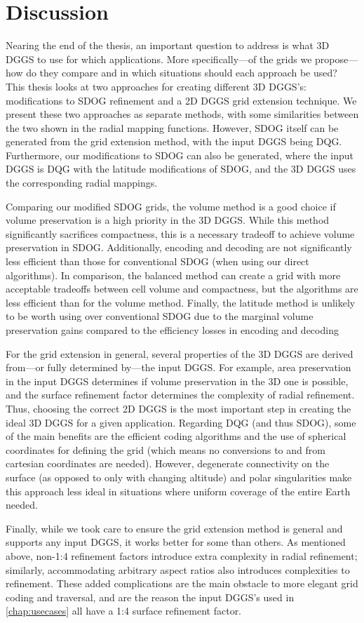 \chapter{Discussion} \label{chap:discussion}
Nearing the end of the thesis, an important question to address is what 3D DGGS to use for which applications.
More specifically---of the grids we propose---how do they compare and in which situations should each approach be used?
This thesis looks at two approaches for creating different 3D DGGS's: modifications to SDOG refinement and a 2D DGGS grid extension technique.
We present these two approaches as separate methods, with some similarities between the two shown in the radial mapping functions.
However, SDOG itself can be generated from the grid extension method, with the input DGGS being DQG.
Furthermore, our modifications to SDOG can also be generated, where the input DGGS is DQG with the latitude modifications of SDOG, and the 3D DGGS uses the corresponding radial mappings.


Comparing our modified SDOG grids, the volume method is a good choice if volume preservation is a high priority in the 3D DGGS.
While this method significantly sacrifices compactness, this is a necessary tradeoff to achieve volume preservation in SDOG. Additionally, encoding and decoding are not significantly less efficient than those for conventional SDOG (when using our direct algorithms).
In comparison, the balanced method can create a grid with more acceptable tradeoffs between cell volume and compactness, but the algorithms are less efficient than for the volume method.
Finally, the latitude method is unlikely to be worth using over conventional SDOG due to the marginal volume preservation gains compared to the efficiency losses in encoding and decoding


For the grid extension in general, several properties of the 3D DGGS are derived from---or fully determined by---the input DGGS.
For example, area preservation in the input DGGS determines if volume preservation in the 3D one is possible, and the surface refinement factor determines the complexity of radial refinement.
Thus, choosing the correct 2D DGGS is the most important step in creating the ideal 3D DGGS for a given application.
Regarding DQG (and thus SDOG), some of the main benefits are the efficient coding algorithms and the use of spherical coordinates for defining the grid (which means no conversions to and from cartesian coordinates are needed).
However, degenerate connectivity on the surface (as opposed to only with changing altitude) and polar singularities make this approach less ideal in situations where uniform coverage of the entire Earth needed.


Finally, while we took care to ensure the grid extension method is general and supports any input DGGS, it works better for some than others.
As mentioned above, non-1:4 refinement factors introduce extra complexity in radial refinement; similarly, accommodating arbitrary aspect ratios also introduces complexities to refinement.
These added complications are the main obstacle to more elegant grid coding and traversal, and are the reason the input DGGS's used in \cref{chap:usecases} all have a 1:4 surface refinement factor.
